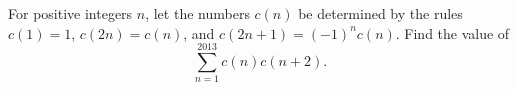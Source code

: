 For positive integers $n$, let the numbers $c(n)$ be determined by 
the rules $c(1) = 1$, $c(2n) = c(n)$, and $c(2n+1) = (-1)^n c(n)$.
Find the value of 
\[
\sum_{n=1}^{2013} c(n) c(n+2).
\]

